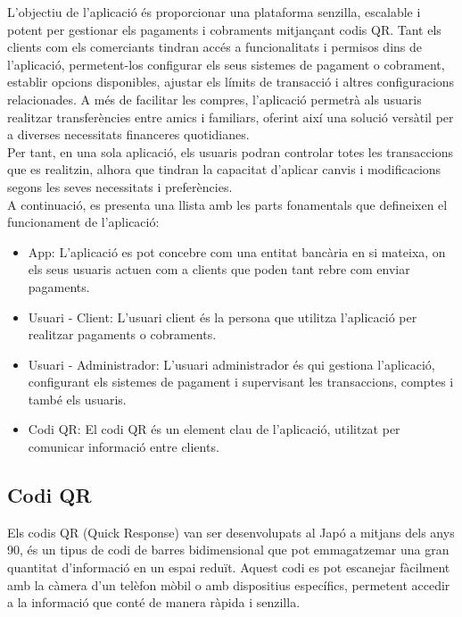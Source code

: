 \documentclass[a4paper,12pt,twoside]{ThesisStyle}
\begin{document}
L'objectiu de l'aplicació és proporcionar una plataforma senzilla, escalable i potent per gestionar els pagaments i cobraments mitjançant codis QR. Tant els clients com els comerciants tindran accés a funcionalitats i permisos dins de l'aplicació, permetent-los configurar els seus sistemes de pagament o cobrament, establir opcions disponibles, ajustar els límits de transacció i altres configuracions relacionades. A més de facilitar les compres, l'aplicació permetrà als usuaris realitzar transferències entre amics i familiars, oferint així una solució versàtil per a diverses necessitats financeres quotidianes.\\

Per tant, en una sola aplicació, els usuaris podran controlar totes les transaccions que es realitzin, alhora que tindran la capacitat d'aplicar canvis i modificacions segons les seves necessitats i preferències.\\


A continuació, es presenta una llista amb les parts fonamentals que defineixen el funcionament de l'aplicació:

\begin{itemize}
    \item App: L'aplicació es pot concebre com una entitat bancària en si mateixa, on els seus usuaris actuen com a clients que poden tant rebre com enviar pagaments. 
    \item Usuari - Client: L'usuari client és la persona que utilitza l'aplicació per realitzar pagaments o cobraments.
    \item Usuari - Administrador: L'usuari administrador és qui gestiona l'aplicació, configurant els sistemes de pagament i supervisant les transaccions, comptes i també els usuaris.
    \item Codi QR: El codi QR és un element clau de l'aplicació, utilitzat per comunicar informació entre clients.

\end{itemize}



\subsection{Codi QR}
\label{subsec: Codi QR}

Els codis QR (Quick Response) van ser desenvolupats al Japó a mitjans dels anys 90, és un tipus de codi de barres bidimensional que pot emmagatzemar una gran quantitat d'informació en un espai reduït. Aquest codi es pot escanejar fàcilment amb la càmera d'un telèfon mòbil o amb dispositius específics, permetent accedir a la informació que conté de manera ràpida i senzilla.\\
\end{document}
